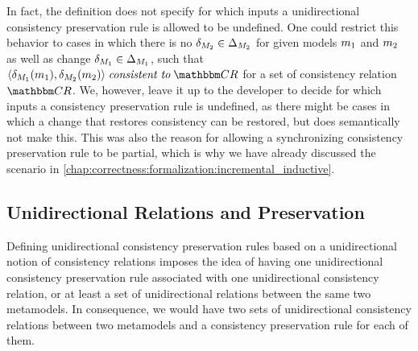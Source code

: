 In fact, the definition does not specify for which inputs a unidirectional consistency preservation rule is allowed to be undefined.
One could restrict this behavior to cases in which there is no $\delta_{M_{2}} \in \Delta_{M_{2}}$ for given models $m_{1}$ and $m_{2}$ as well as change $\delta_{M_{1}} \in \Delta_{M_{1}}$, such that $\tupled{\change{\metamodel{M}{1}}(\model{m}{1}), \change{\metamodel{M}{2}}(\model{m}{2})} \consistenttomath \consistencyrelationset{CR}$ for a set of consistency relation $\consistencyrelationset{CR}$.
We, however, leave it up to the developer to decide for which inputs a consistency preservation rule is undefined, as there might be cases in which a change that restores consistency can be restored, but does semantically not make this.
This was also the reason for allowing a synchronizing consistency preservation rule to be partial, which is why we have already discussed the scenario in \autoref{chap:correctness:formalization:incremental_inductive}.


\subsection{Unidirectional Relations and Preservation} %
\label{chap:synchronization:gap:alignment}

Defining unidirectional consistency preservation rules based on a unidirectional notion of consistency relations imposes the idea of having one unidirectional consistency preservation rule associated with one unidirectional consistency relation, or at least a set of unidirectional relations between the same two metamodels.
In consequence, we would have two sets of unidirectional consistency relations between two metamodels and a consistency preservation rule for each of them.

